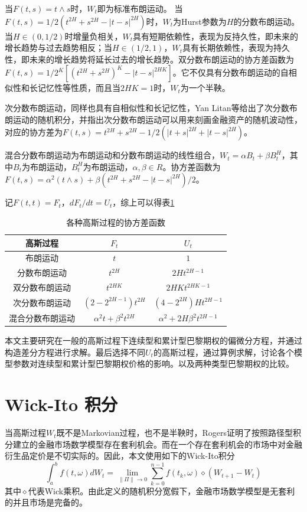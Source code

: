 \documentclass{ctexart} %
\begin{document}
当$F(t,s)=t\wedge s$时，$W_t$即为标准布朗运动。 当$F(t,s)=1/2(t^{2H}+s^{2H}-|t-s|^{2H})$时，$W_t$为Hurst参数为$H$的分数布朗运动。当$H\in(0,1/2)$时增量负相关，$W_t$具有短期依赖性，表现为反持久性，即未来的增长趋势与过去趋势相反；当$H\in(1/2,1)$，$W_t$具有长期依赖性，表现为持久性，即未来的增长趋势将延长过去的增长趋势。双分数布朗运动的协方差函数为$F(t,s)=1/2^K[(t^{2H}+s^{2H})^K-|t-s|^{2HK}]$。它不仅具有分数布朗运动的自相似性和长记忆性等性质，而且当$2HK=1$时，$W_t$为一个半鞅。

次分数布朗运动，同样也具有自相似性和长记忆性，Yan Litan等给出了次分数布朗运动的随机积分，并指出次分数布朗运动可以用来刻画金融资产的随机波动性，对应的协方差为$F(t,s)=t^{2H}+s^{2H}-1/2(|t+s|^{2H}+|t-s|^{2H})$。

混合分数布朗运动为布朗运动和分数布朗运动的线性组合，$W_t=\alpha B_t+\beta B_t^H$，其中$B_t$为布朗运动，$B_t^H$为布朗运动，$\alpha,\beta \in R$。协方差函数为$F(t,s)=\alpha^2(t\wedge s)+\beta(t^{2H}+s^{2H}-|t-s|^{2H})/2$。

记$F(t,t)=F_t$，$dF_t/dt=U_t$，综上可以得表\ref{tabl1}
\begin{table}[htbp]
\centering
\caption{各种高斯过程的协方差函数}
\label{tabl1}
\begin{tabular}{ccc}
\hline
高斯过程& $F_t$ & $U_t$ \\
\hline
布朗运动 & $t$ & $1$ \\
分数布朗运动 & $t^{2H}$ & $2Ht^{2H-1}$ \\
双分数布朗运动 & $t^{2HK}$ & $2HKt^{2HK-1}$ \\
次分数布朗运动 & $(2-2^{2H-1})t^{2H}$ & $(4-2^{2H})Ht^{2H-1}$ \\
混合分数布朗运动 & $\alpha^2t+\beta^2t^{2H}$ & $\alpha^2+2H\beta^2t^{2H-1}$ \\
\hline
\end{tabular}
\end{table}

本文主要研究在一般的高斯过程下连续型和累计型巴黎期权的偏微分方程，并通过构造差分方程进行求解。最后选择不同$U_t$的高斯过程，通过算例求解，讨论各个模型参数对连续型和累计型巴黎期权价格的影响。以及两种类型巴黎期权的比较。


\section{Wick-Ito 积分}
当高斯过程$W_t$既不是Markovian过程，也不是半鞅时，Rogers证明了按照路径型积分建立的金融市场数学模型存在套利机会。而在一个存在套利机会的市场中对金融衍生品定价是不切实际的。因此，本文使用如下的Wick-Ito积分
\begin{equation}
\int_a^bf(t,\omega)dW_t=\lim_{\| \Pi\| \rightarrow0}\sum^{n-1}_{k=0}f(t_k,\omega)\diamond (W_{t+1}-W_t)
\end{equation}
其中$\diamond$代表Wick乘积。由此定义的随机积分宽假下，金融市场数学模型是无套利的并且市场是完备的。
\end{document}
